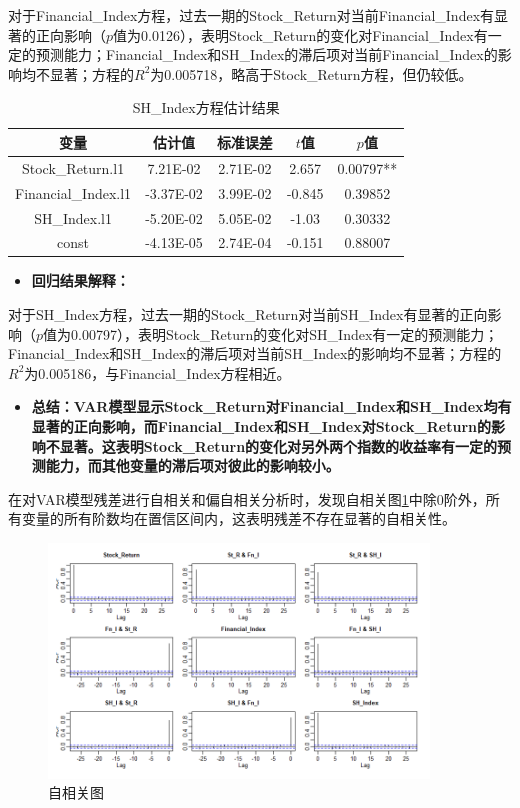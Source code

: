 \documentclass[12pt]{article}
\begin{document}
对于Financial\_Index方程，过去一期的Stock\_Return对当前Financial\_Index有显著的正向影响（$p$值为0.0126），表明Stock\_Return的变化对Financial\_Index有一定的预测能力；Financial\_Index和SH\_Index的滞后项对当前Financial\_Index的影响均不显著；方程的$R^2$为0.005718，略高于Stock\_Return方程，但仍较低。

\begin{table}[H]
    \centering
    \caption{SH\_Index方程估计结果}
    \label{tab:VAR3}
    \begin{tabular}{ccccc}
        \toprule
        变量 & 估计值 & 标准误差 & $t$值 & $p$值 \\
        \midrule
Stock\_Return.l1    & 7.21E-02  & 2.71E-02 & 2.657  & 0.00797** \\
Financial\_Index.l1 & -3.37E-02 & 3.99E-02 & -0.845 & 0.39852   \\
SH\_Index.l1        & -5.20E-02 & 5.05E-02 & -1.03  & 0.30332   \\
const               & -4.13E-05 & 2.74E-04 & -0.151 & 0.88007   \\
        \bottomrule
    \end{tabular}
\end{table}

\begin{itemize}
    \item \textbf{回归结果解释：}
\end{itemize}

对于SH\_Index方程，过去一期的Stock\_Return对当前SH\_Index有显著的正向影响（$p$值为0.00797），表明Stock\_Return的变化对SH\_Index有一定的预测能力；Financial\_Index和SH\_Index的滞后项对当前SH\_Index的影响均不显著；方程的$R^2$为0.005186，与Financial\_Index方程相近。

\begin{itemize}
    \item \textbf{总结：VAR模型显示Stock\_Return对Financial\_Index和SH\_Index均有显著的正向影响，而Financial\_Index和SH\_Index对Stock\_Return的影响不显著。这表明Stock\_Return的变化对另外两个指数的收益率有一定的预测能力，而其他变量的滞后项对彼此的影响较小。}
\end{itemize}

\newpage
在对VAR模型残差进行自相关和偏自相关分析时，发现自相关图\ref{fig:自}中除0阶外，所有变量的所有阶数均在置信区间内，这表明残差不存在显著的自相关性。

\begin{figure}[H]
\centering
\includegraphics[width=0.9\textwidth]{VAR1.png}
\caption{自相关图}
\label{fig:自}
\end{figure}
\end{document}
